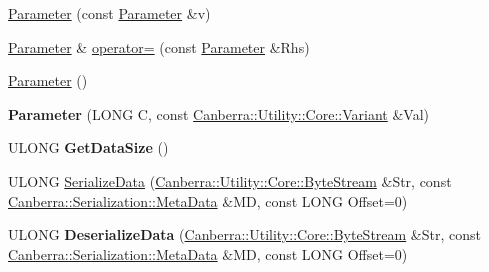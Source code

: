 \begin{DoxyCompactItemize}
\item 
\hyperlink{class_canberra_1_1_data_types_1_1_application_1_1_parameter_a633d52a56d6b21cd653380900ee85f82_a633d52a56d6b21cd653380900ee85f82}{Parameter} (const \hyperlink{class_canberra_1_1_data_types_1_1_application_1_1_parameter}{Parameter} \&v)
\item 
\hyperlink{class_canberra_1_1_data_types_1_1_application_1_1_parameter}{Parameter} \& \hyperlink{class_canberra_1_1_data_types_1_1_application_1_1_parameter_a9957ddd72a7094629242cd334978c375_a9957ddd72a7094629242cd334978c375}{operator=} (const \hyperlink{class_canberra_1_1_data_types_1_1_application_1_1_parameter}{Parameter} \&Rhs)
\item 
\hyperlink{class_canberra_1_1_data_types_1_1_application_1_1_parameter_ab3693e0f7ac1d72f92b644632a4900a8_ab3693e0f7ac1d72f92b644632a4900a8}{Parameter} ()
\item 
\mbox{\label{class_canberra_1_1_data_types_1_1_application_1_1_parameter_a71a5964ba268a4946ba215208ac65c0a}} 
{\bfseries Parameter} (L\+O\+NG C, const \hyperlink{class_canberra_1_1_utility_1_1_core_1_1_variant}{Canberra\+::\+Utility\+::\+Core\+::\+Variant} \&Val)
\item 
\mbox{\label{class_canberra_1_1_data_types_1_1_application_1_1_parameter_a51d743897f0420d65ee5ae6a994deff8}} 
U\+L\+O\+NG {\bfseries Get\+Data\+Size} ()
\item 
U\+L\+O\+NG \hyperlink{class_canberra_1_1_data_types_1_1_application_1_1_parameter_a2c39a0404f163579143f14ece019ff6c_a2c39a0404f163579143f14ece019ff6c}{Serialize\+Data} (\hyperlink{class_canberra_1_1_utility_1_1_core_1_1_byte_stream}{Canberra\+::\+Utility\+::\+Core\+::\+Byte\+Stream} \&Str, const \hyperlink{class_canberra_1_1_serialization_1_1_meta_data}{Canberra\+::\+Serialization\+::\+Meta\+Data} \&MD, const L\+O\+NG Offset=0)
\item 
\mbox{\label{class_canberra_1_1_data_types_1_1_application_1_1_parameter_a5c63e137e8853b94b2bd80a549913643}} 
U\+L\+O\+NG {\bfseries Deserialize\+Data} (\hyperlink{class_canberra_1_1_utility_1_1_core_1_1_byte_stream}{Canberra\+::\+Utility\+::\+Core\+::\+Byte\+Stream} \&Str, const \hyperlink{class_canberra_1_1_serialization_1_1_meta_data}{Canberra\+::\+Serialization\+::\+Meta\+Data} \&MD, const L\+O\+NG Offset=0)

\end{DoxyCompactItemize}
